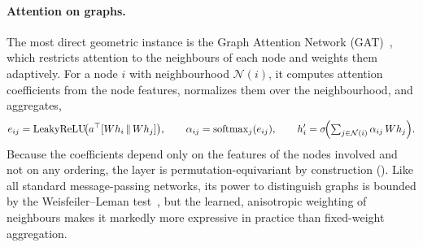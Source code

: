 \paragraph{Attention on graphs.}
The most direct geometric instance is the Graph Attention Network
(GAT)~\citep{velickovic2017graph}, which restricts attention to the neighbours
of each node and weights them adaptively. For a node $i$ with neighbourhood
$\mathcal{N}(i)$, it computes attention coefficients from the node features,
normalizes them over the neighbourhood, and aggregates,
\[
  e_{ij} = \operatorname{LeakyReLU}\!\bigl(a^\top[Wh_i \,\|\, Wh_j]\bigr),
  \qquad
  \alpha_{ij} = \operatorname{softmax}_j(e_{ij}),
  \qquad
  h_i' = \sigma\!\Bigl(\textstyle\sum_{j\in\mathcal{N}(i)} \alpha_{ij}\,Wh_j\Bigr).
\]
Because the coefficients depend only on the features of the nodes involved and
not on any ordering, the layer is permutation-equivariant by construction
(). Like all standard message-passing networks, its power to
distinguish graphs is bounded by the Weisfeiler--Leman test~\citep{xu2019how},
but the learned, anisotropic weighting of neighbours makes it markedly more
expressive in practice than fixed-weight aggregation.

